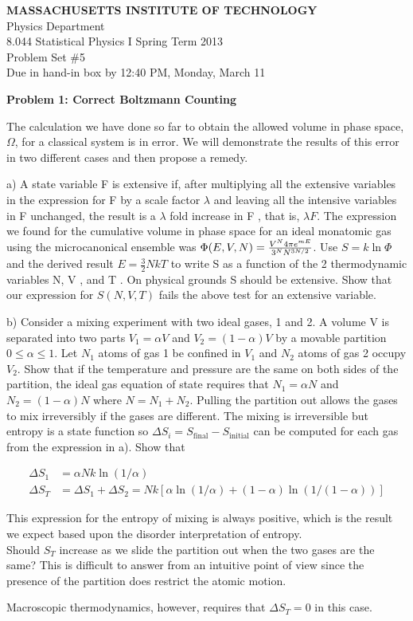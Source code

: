 \documentclass{article}
\begin{document}
\begin{center}
\textbf{MASSACHUSETTS INSTITUTE OF TECHNOLOGY} \\
Physics Department \\
8.044 Statistical Physics I Spring Term 2013 \\
Problem Set \#5 \\
Due in hand-in box by 12:40 PM, Monday, March 11 
\end{center}

\noindent \textbf{Problem 1: Correct Boltzmann Counting} 

\noindent The calculation we have done so far to obtain the allowed volume in phase space, $\Omega$, for a 
classical system is in error. We will demonstrate the results of this error in two different 
cases and then propose a remedy. 

\noindent a) A state variable F is extensive if, after multiplying all the extensive variables in the expression for F by a scale factor $\lambda$ and leaving all the intensive variables in F unchanged, 
the result is a $\lambda$ fold increase in F , that is, $\lambda F$. The expression we found for the cumulative volume in phase space for an ideal monatomic gas using the microcanonical 
ensemble was 
$\Phi(E, V, N) = \frac{V^{N} \space 4 \pi e^{mE}}{3^{N} \space N^{3N/2}}$.
Use $S = k \ln \Phi$ and the derived result $E = \frac{3}{2} NkT$ to write S as a function of the 2 thermodynamic variables N, V , and T . On physical grounds S should be extensive. 
Show that our expression for $S(N, V, T)$ fails the above test for an extensive variable. 

\noindent b) Consider a mixing experiment with two ideal gases, 1 and 2. A volume V is separated 
into two parts $V_{1} = \alpha V$ and $V_{2} = (1 - \alpha) V$ by a movable partition $0 \leq \alpha \leq 1$. Let 
$N_{1}$ atoms of gas 1 be confined in $V_{1}$ and $N_{2}$ atoms of gas 2 occupy $V_{2}$. Show that if 
the temperature and pressure are the same on both sides of the partition, the ideal 
gas equation of state requires that $N_{1} = \alpha N$ and $N_{2} = (1 - \alpha)N$ where $N = N_{1} + N_{2}$. 
Pulling the partition out allows the gases to mix irreversibly if the gases are different. 
The mixing is irreversible but entropy is a state function so $\Delta S_{i} = S_{\text{final}} - S_{\text{initial}}$ 
can be computed for each gas from the expression in a). Show that 

\begin{align*}
\Delta S_{1} &= \alpha Nk \ln(1/\alpha) \\
\Delta S_{T} &= \Delta S_{1} + \Delta S_{2} = Nk [\alpha \ln(1/\alpha) + (1 - \alpha) \ln(1/(1 - \alpha))] 
\end{align*}

\noindent This expression for the entropy of mixing is always positive, which is the result we 
expect based upon the disorder interpretation of entropy. \\
Should $S_{T}$ increase as we slide the partition out when the two gases are the same? This 
is difficult to answer from an intuitive point of view since the presence of the partition 
does restrict the atomic motion. 

\noindent Macroscopic thermodynamics, however, requires that $\Delta S_{T} = 0$ in this case. 
\end{document}
